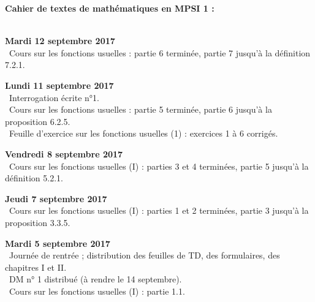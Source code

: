 \documentclass[12pt,a4paper]{article}
\begin{document}
\begin{center}
\Large\bf Cahier de textes de mathématiques en MPSI 1 :
\end{center}
\vspace{1cm}
\vspace{.4cm}\\

\noindent\textbf{Mardi 12 septembre 2017}\\
\bu\ Cours sur les fonctions usuelles : partie 6 terminée, partie 7 jusqu'à la définition 7.2.1. \\
\vspace{.4cm}

\noindent\textbf{Lundi 11 septembre 2017}\\
\bu\ Interrogation écrite n°1. \\
\bu\ Cours sur les fonctions usuelles : partie 5 terminée, partie 6 jusqu'à la proposition 6.2.5. \\
\bu\ Feuille d'exercice sur les fonctions usuelles (1) : exercices 1 à 6 corrigés. \\
\vspace{.4cm}

\noindent\textbf{Vendredi 8 septembre 2017}\\
\bu\ Cours sur les fonctions usuelles (I) : parties 3 et 4 terminées, partie 5 jusqu'à la définition 5.2.1. \\
\vspace{.4cm}

\noindent\textbf{Jeudi 7 septembre 2017}\\
\bu\ Cours sur les fonctions usuelles (I) : parties 1 et 2 terminées, partie 3 jusqu'à la proposition 3.3.5. \\
\vspace{.4cm}

\noindent\textbf{Mardi 5 septembre 2017}\\
\bu\ Journée de rentrée ; distribution des feuilles de TD, des formulaires, des
chapitres I et II.  \\
\bu\ DM n° 1 distribué (à rendre le 14 septembre). \\
\bu\ Cours sur les fonctions usuelles (I) : partie 1.1. \\
\vspace{.4cm}


\label{end}
\end{document}
